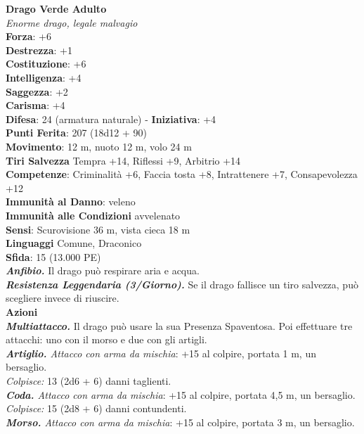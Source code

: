\begin{multicols}{2}
\medskip\textbf{Drago Verde Adulto}\\
\emph{Enorme drago, legale malvagio}\\
\textbf{Forza}: +6\\
\textbf{Destrezza}: +1\\
\textbf{Costituzione}: +6\\
\textbf{Intelligenza}: +4\\
\textbf{Saggezza}: +2\\
\textbf{Carisma}: +4\\
\textbf{Difesa}: 24 (armatura naturale) - \textbf{Iniziativa}: +4\\
\textbf{Punti Ferita}: 207 (18d12 + 90)\\
\textbf{Movimento}: 12 m, nuoto 12 m, volo 24 m\\
\textbf{Tiri Salvezza} Tempra +14, Riflessi +9, Arbitrio +14\\
\textbf{Competenze}: Criminalità +6, Faccia tosta +8, Intrattenere +7, Consapevolezza +12\\
\textbf{Immunità al Danno}: veleno\\
\textbf{Immunità alle Condizioni} avvelenato\\
\textbf{Sensi}: Scurovisione 36 m, vista cieca 18 m\\
\textbf{Linguaggi} Comune, Draconico\\
\textbf{Sfida}: 15 (13.000 PE)\smallskip\\
\emph{\textbf{Anfibio.}} Il drago può respirare aria e acqua.\\
\emph{\textbf{Resistenza Leggendaria (3/Giorno).}} Se il drago fallisce un tiro salvezza, può scegliere invece di riuscire.\\
\smallskip\textbf{Azioni}\\
\emph{\textbf{Multiattacco.}} Il drago può usare la sua Presenza Spaventosa. Poi effettuare tre attacchi: uno con il morso e due con gli artigli.\\
\emph{\textbf{Artiglio.} Attacco con arma da mischia}: +15 al colpire, portata 1 m, un bersaglio.\\
\emph{Colpisce:} 13 (2d6 + 6) danni taglienti.\\
\emph{\textbf{Coda.} Attacco con arma da mischia}: +15 al colpire, portata 4,5 m, un bersaglio.\\
\emph{Colpisce:} 15 (2d8 + 6) danni contundenti. \\
\emph{\textbf{Morso.} Attacco con arma da mischia}: +15 al colpire, portata 3 m, un bersaglio.\\

\end{multicols}
